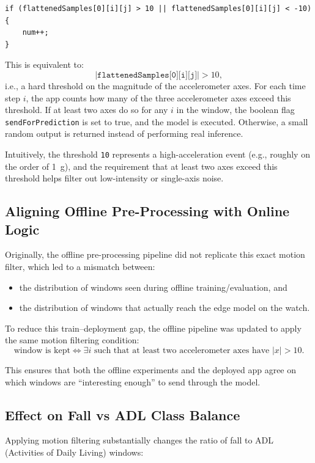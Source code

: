 \begin{verbatim}
if (flattenedSamples[0][i][j] > 10 || flattenedSamples[0][i][j] < -10) {
    num++;
}
\end{verbatim}

This is equivalent to:
\[
    \lvert \texttt{flattenedSamples[0][i][j]} \rvert > 10,
\]
i.e., a hard threshold on the magnitude of the accelerometer axes. For each time step $i$, the app counts how many of the three accelerometer axes exceed this threshold. If at least two axes do so for any $i$ in the window, the boolean flag \texttt{sendForPrediction} is set to true, and the model is executed. Otherwise, a small random output is returned instead of performing real inference.

Intuitively, the threshold \texttt{10} represents a high-acceleration event (e.g., roughly on the order of \SI{1}{g}), and the requirement that at least two axes exceed this threshold helps filter out low-intensity or single-axis noise.

\subsection{Aligning Offline Pre-Processing with Online Logic}

Originally, the offline pre-processing pipeline did not replicate this exact motion filter, which led to a mismatch between:
\begin{itemize}
    \item the distribution of windows seen during offline training/evaluation, and
    \item the distribution of windows that actually reach the edge model on the watch.
\end{itemize}

To reduce this train--deployment gap, the offline pipeline was updated to apply the same motion filtering condition:
\[
    \text{window is kept} \iff \exists i \text{ such that at least two accelerometer axes have } \lvert x \rvert > 10.
\]

This ensures that both the offline experiments and the deployed app agree on which windows are ``interesting enough'' to send through the model.

\subsection{Effect on Fall vs ADL Class Balance}

Applying motion filtering substantially changes the ratio of fall to ADL (Activities of Daily Living) windows:

